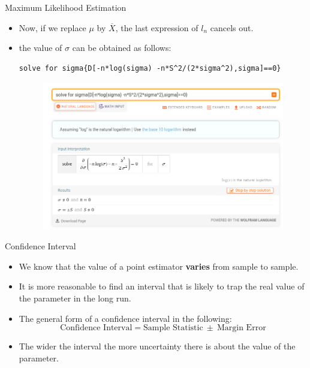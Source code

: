 \documentclass[handout]{beamer}
\begin{document}
\begin{frame}[fragile]{Maximum Likelihood Estimation}
\scriptsize{
\begin{itemize}
\item Now, if we replace $\mu$ by $\overline{X}$, the last expression of $l_n$ cancels out.

\item the value of $\sigma$ can be obtained as follows:

\begin{verbatim}
solve for sigma{D[-n*log(sigma) -n*S^2/(2*sigma^2),sigma]==0}
\end{verbatim}

\begin{figure}[h!]
	\centering
	\includegraphics[scale=0.32]{pics/wolfram_s.png}
\end{figure}



\end{itemize}



} 

 

 
\end{frame}


\begin{frame}{Confidence Interval}
\scriptsize{
\begin{itemize}
 \item We know that the value of a point estimator \textbf{varies} from sample to sample.
 \item It is more reasonable to find an interval that is likely to trap the real value of the parameter in the long run.
 \item The general form of a confidence interval in the following:
  \begin{displaymath}
   \text{Confidence Interval} = \text{Sample Statistic} \ \pm \ \text{Margin Error}
  \end{displaymath}
 \item The wider the interval the more uncertainty there is about the value of the parameter.
\end{itemize}


}
 
\end{frame}
\end{document}
